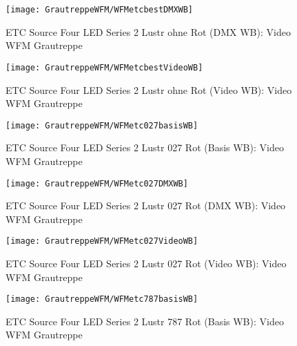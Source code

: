 \documentclass[pagesize,paper=A4,fontsize=12pt,utf8,numbers=noenddot,bibliography=totoc,listof=totoc,DIV=11,BCOR=1mm]{scrreprt}
\begin{document}
\begin{figure}[htp]     %
\centering
\texttt{[image: GrautreppeWFM/WFMetcbestDMXWB]} 
\caption {ETC Source Four LED Series 2 Lustr ohne Rot (DMX WB): Video WFM Grautreppe} 
\end{figure}

\begin{figure}[htp]     %
\centering
\texttt{[image: GrautreppeWFM/WFMetcbestVideoWB]} 
\caption {ETC Source Four LED Series 2 Lustr ohne Rot (Video WB): Video WFM Grautreppe} 
\end{figure}



\begin{figure}[htp]     %
\centering
\texttt{[image: GrautreppeWFM/WFMetc027basisWB]} 
\caption {ETC Source Four LED Series 2 Lustr 027 Rot (Basis WB): Video WFM Grautreppe} 
\end{figure}

\begin{figure}[htp]     %
\centering
\texttt{[image: GrautreppeWFM/WFMetc027DMXWB]} 
\caption {ETC Source Four LED Series 2 Lustr 027 Rot (DMX WB): Video WFM Grautreppe} 
\end{figure}

\begin{figure}[htp]     %
\centering
\texttt{[image: GrautreppeWFM/WFMetc027VideoWB]} 
\caption {ETC Source Four LED Series 2 Lustr 027 Rot (Video WB): Video WFM Grautreppe} 
\end{figure}



\begin{figure}[htp]     %
\centering
\texttt{[image: GrautreppeWFM/WFMetc787basisWB]} 
\caption {ETC Source Four LED Series 2 Lustr 787 Rot (Basis WB): Video WFM Grautreppe} 
\end{figure}
\end{document}
